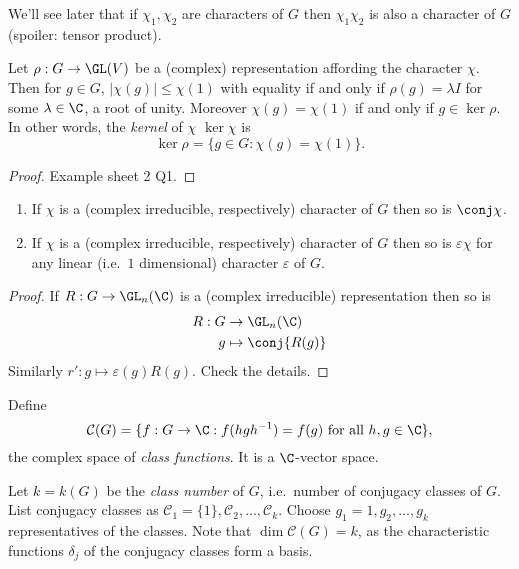 \documentclass[a4paper]{article}
\begin{document}
\begin{remark}
  We'll see later that if \(\chi_1, \chi_2\) are characters of \(G\) then \(\chi_1\chi_2\) is also a character of \(G\) (spoiler: tensor product).
\end{remark}

\begin{lemma}
  Let \(\rho: G \to \GL(V)\) be a (complex) representation affording the character \(\chi\). Then for \(g \in G\), \(|\chi(g)| \leq \chi(1)\) with equality if and only if \(\rho(g) = \lambda I\) for some \(\lambda \in \C\), a root of unity. Moreover \(\chi(g) = \chi(1)\) if and only if \(g \in \ker \rho\). In other words, the \emph{kernel} of \(\chi\) \(\ker \chi\) is
  \[
    \ker \rho = \{g \in G: \chi(g) = \chi(1)\}.
  \]
\end{lemma}

\begin{proof}
  Example sheet 2 Q1.
\end{proof}

\begin{lemma}\leavevmode
  \begin{enumerate}
  \item If \(\chi\) is a (complex irreducible, respectively) character of \(G\) then so is \(\conj \chi\).
  \item If \(\chi\) is a (complex irreducible, respectively) character of \(G\) then so is \(\varepsilon \chi\) for any linear (i.e.\ \(1\) dimensional) character \(\varepsilon\) of \(G\).
  \end{enumerate}
\end{lemma}

\begin{proof}
  If \(R: G \to \GL_n(\C)\) is a (complex irreducible) representation then so is
  \begin{align*}
    R: G &\to \GL_n(\C) \\
    g &\mapsto \conj{R(g)}
  \end{align*}
  Similarly \(r': g \mapsto \varepsilon(g) R(g)\). Check the details.
\end{proof}

\begin{definition}
  Define
  \[
    \mathcal C(G) = \{f: G \to \C: f(hgh^{-1}) = f(g) \text{ for all } h, g \in \C\},
  \]
  the complex space of \emph{class functions}. It is a \(\C\)-vector space.

  Let \(k = k(G)\) be the \emph{class number} of \(G\), i.e.\ number of conjugacy classes of \(G\). List conjugacy classes as \(\mathcal C_1 = \{1\}, \mathcal C_2, \dots, \mathcal C_k\). Choose \(g_1 = 1, g_2, \dots, g_k\) representatives of the classes. Note that \(\dim \mathcal C(G) = k\), as the characteristic functions \(\delta_j\) of the conjugacy classes form a basis.
\end{definition}
\end{document}
